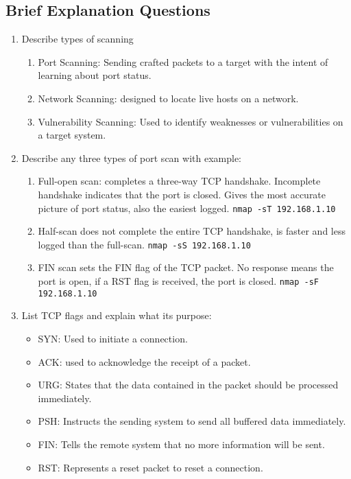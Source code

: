 \subsection{Brief Explanation Questions}
\begin{enumerate}
    \item Describe types of scanning
    \begin{enumerate}
        \item Port Scanning: Sending crafted packets to a target with the intent of learning about port status.
        \item Network Scanning: designed to locate live hosts on a network.
        \item Vulnerability Scanning: Used to identify weaknesses or vulnerabilities on a target system.
    \end{enumerate}
    \item Describe any three types of port scan with example:
    \begin{enumerate}
        \item Full-open scan: completes a three-way TCP handshake. Incomplete handshake indicates that the port is closed. Gives the most accurate picture of port status, also the easiest logged. \verb|nmap -sT 192.168.1.10|
        \item Half-scan does not complete the entire TCP handshake, is faster and less logged than the full-scan. \verb|nmap -sS 192.168.1.10|
        \item FIN scan sets the FIN flag of the TCP packet. No response means the port is open, if a RST flag is received, the port is closed. \verb|nmap -sF 192.168.1.10|
    \end{enumerate}
    \item List TCP flags and explain what its purpose:
    \begin{itemize}
        \item SYN: Used to initiate a connection.
        \item ACK: used to acknowledge the receipt of a packet.
        \item URG: States that the data contained in the packet should be processed immediately.
        \item PSH: Instructs the sending system to send all buffered data immediately.
        \item FIN: Tells the remote system that no more information will be sent.
        \item RST: Represents a reset packet to reset a connection.
    \end{itemize}

\end{enumerate}
